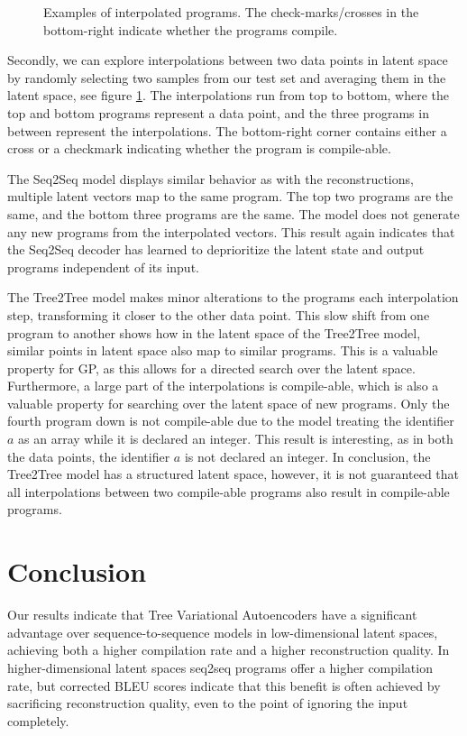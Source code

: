 \begin{figure}
    \caption{Examples of interpolated programs. The check-marks/crosses in the bottom-right indicate whether the programs compile.}
    \label{fig:interpolation_examples}
\end{figure}

Secondly, we can explore interpolations between two data points in latent space by randomly selecting two samples from our test set and averaging them in the latent space, see figure \ref{fig:interpolation_examples}. The interpolations run from top to bottom, where the top and bottom programs represent a data point, and the three programs in between represent the interpolations. The bottom-right corner contains either a cross or a checkmark indicating whether the program is compile-able.


The Seq2Seq model displays similar behavior as with the reconstructions, multiple latent vectors map to the same program. The top two programs are the same, and the bottom three programs are the same. The model does not generate any new programs from the interpolated vectors. This result again indicates that the Seq2Seq decoder has learned to deprioritize the latent state and output programs independent of its input. 

The Tree2Tree model makes minor alterations to the programs each interpolation step, transforming it closer to the other data point. This slow shift from one program to another shows how in the latent space of the Tree2Tree model, similar points in latent space also map to similar programs. This is a valuable property for GP, as this allows for a directed search over the latent space. Furthermore, a large part of the interpolations is compile-able, which is also a valuable property for searching over the latent space of new programs. Only the fourth program down is not compile-able due to the model treating the identifier $a$ as an array while it is declared an integer. This result is interesting, as in both the data points, the identifier $a$ is not declared an integer. In conclusion, the Tree2Tree model has a structured latent space, however, it is not guaranteed that all interpolations between two compile-able programs also result in compile-able programs.
\newpage
\section{Conclusion}

Our results indicate that Tree Variational Autoencoders have a significant advantage over sequence-to-sequence models in low-dimensional latent spaces, achieving both a higher compilation rate and a higher reconstruction quality.
In higher-dimensional latent spaces seq2seq programs offer a higher compilation rate, but corrected BLEU scores indicate that this benefit is often achieved by sacrificing reconstruction quality, even to the point of ignoring the input completely.

